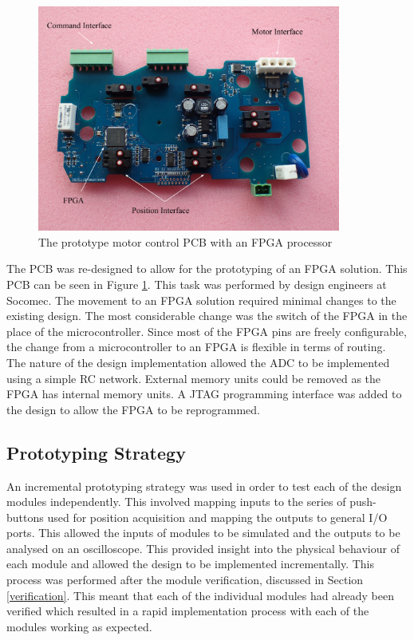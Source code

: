 \begin{figure}[h]
\centering
\includegraphics[width=0.89\textwidth]{images/PrototypeBoard.pdf}
\caption{The prototype motor control PCB with an FPGA processor}
\label{board}
\end{figure}

The PCB was re-designed to allow for the prototyping of an FPGA solution. This PCB can be seen in Figure \ref{board}. This task was performed by design engineers at Socomec. The movement to an FPGA solution required minimal changes to the existing design. The most considerable change was the switch of the FPGA in the place of the microcontroller. Since most of the FPGA pins are freely configurable, the change from a microcontroller to an FPGA is flexible in terms of routing\cite{SalewskiSystematic}. The nature of the design implementation allowed the ADC to be implemented using a simple RC network. External memory units could be removed as the FPGA has internal memory units. A JTAG programming interface was added to the design to allow the FPGA to be reprogrammed.

\subsection{Prototyping Strategy}
\label{prototyping-strategy}
An incremental prototyping strategy was used in order to test each of the design modules independently. This involved mapping inputs to the series of push-buttons used for position acquisition and mapping the outputs to general I/O ports. This allowed the inputs of modules to be simulated and the outputs to be analysed on an oscilloscope. This provided insight into the physical behaviour of each module and allowed the design to be implemented incrementally. This process was performed after the module verification, discussed in  Section \ref{verification}. This meant that each of the individual modules had already been verified which resulted in a rapid implementation process with each of the modules working as expected. 

